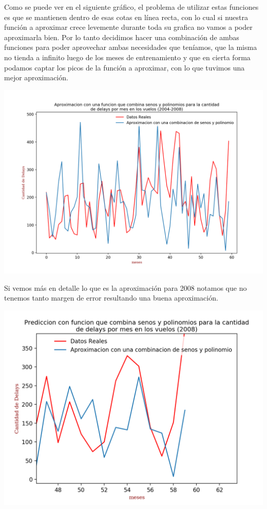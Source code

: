 \documentclass{endm}
\begin{document}
Como se puede ver en el siguiente gr\'afico, el problema de utilizar estas funciones es que se mantienen dentro de esas cotas en l\'inea recta, con lo cual si nuestra funci\'on a aproximar crece levemente durante toda su grafica no vamos a poder aproximarla bien.
Por lo tanto decidimos hacer una combinaci\'on de ambas funciones para poder aprovechar ambas necesidades que ten\'iamos, que la misma no tienda a infinito luego de los meses de entrenamiento y que en cierta forma podamos captar los picos de la funci\'on a aproximar, con lo que tuvimos una mejor aproximaci\'on.

	\begin{center}
	\includegraphics[scale=0.5]{imagenes/polinomioysenos.png}
	\end{center}

Si vemos m\'as en detalle lo que es la aproximaci\'on para 2008 notamos que no tenemos tanto margen de error resultando una buena aproximaci\'on.

	\begin{center}
	\includegraphics[scale=0.8]{imagenes/delays2008.png}
	\end{center}
\end{document}
